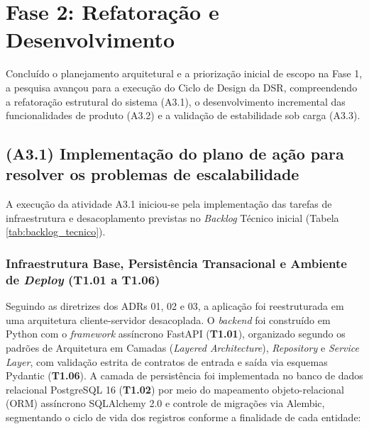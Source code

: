 \section{Fase 2: Refatoração e Desenvolvimento}
\label{sec:execucao_fase2}

Concluído o planejamento arquitetural e a priorização inicial de escopo na Fase 1, a pesquisa avançou para a execução do Ciclo de Design da DSR, compreendendo a refatoração estrutural do sistema (A3.1), o desenvolvimento incremental das funcionalidades de produto (A3.2) e a validação de estabilidade sob carga (A3.3).

\subsection{(A3.1) Implementação do plano de ação para resolver os problemas de escalabilidade}
\label{subsec:exec_a31}

A execução da atividade A3.1 iniciou-se pela implementação das tarefas de infraestrutura e desacoplamento previstas no \textit{Backlog} Técnico inicial (Tabela \ref{tab:backlog_tecnico}).

\subsubsection*{Infraestrutura Base, Persistência Transacional e Ambiente de \textit{Deploy} (T1.01 a T1.06)}

Seguindo as diretrizes dos ADRs 01, 02 e 03, a aplicação foi reestruturada em uma arquitetura cliente-servidor desacoplada. O \textit{backend} foi construído em Python com o \textit{framework} assíncrono FastAPI (\textbf{T1.01}), organizado segundo os padrões de Arquitetura em Camadas (\textit{Layered Architecture}), \textit{Repository} e \textit{Service Layer}, com validação estrita de contratos de entrada e saída via esquemas Pydantic (\textbf{T1.06}). A camada de persistência foi implementada no banco de dados relacional PostgreSQL 16 (\textbf{T1.02}) por meio do mapeamento objeto-relacional (ORM) assíncrono SQLAlchemy 2.0 e controle de migrações via Alembic, segmentando o ciclo de vida dos registros conforme a finalidade de cada entidade:

